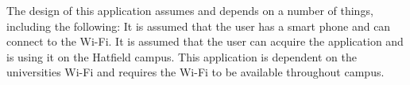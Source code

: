 
{The design of this application assumes and depends on a number of things, including the following: It is assumed that the user has a smart phone and can connect to the Wi-Fi. It is assumed that the user can acquire the application and is using it on the Hatfield campus. This application is dependent on the universities Wi-Fi and requires the Wi-Fi to be available throughout campus.}
